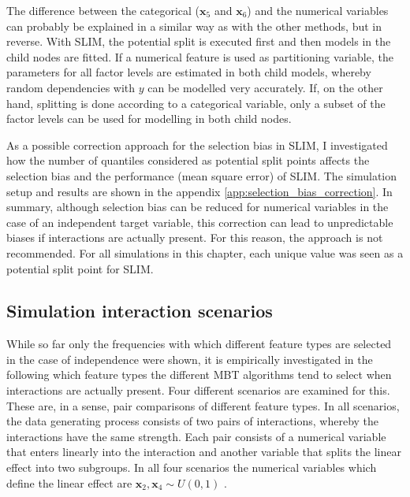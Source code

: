 The difference between the categorical ($\textbf{x}_5$ and $\textbf{x}_6$) and the numerical variables can probably be explained in a similar way as with the other methods, but in reverse. With SLIM, the potential split is executed first and then models in the child nodes are fitted.  If a numerical feature is used as partitioning variable, the parameters for all factor levels are estimated in both child models, whereby random dependencies with $y$ can be modelled very accurately. If, on the other hand, splitting is done according to a categorical variable, only a subset of the factor levels can be used for modelling in both child nodes.






As a possible correction approach for the selection bias in SLIM, I investigated how the number of quantiles considered as potential split points affects the selection bias and the performance (mean square error) of SLIM. The simulation setup and results are shown in the appendix \ref{app:selection_bias_correction}. In summary, although selection bias can be reduced for numerical variables in the case of an independent target variable, this correction can lead to unpredictable biases if interactions are actually present. For this reason, the approach is not recommended. 
For all simulations in this chapter, each unique value was seen as a potential split point for SLIM.






\subsection{Simulation interaction scenarios} \label{selection_bias_interactions}
While so far only the frequencies with which different feature types are selected in the case of independence were shown, it is empirically investigated in the following which feature types the different MBT algorithms tend to select when interactions are actually present.
Four different scenarios are examined for this. These are, in a sense, pair comparisons of different feature types. In all scenarios, the data generating process consists of two pairs of interactions, whereby the interactions have the same strength. Each pair consists of a numerical variable that enters linearly into the interaction and another variable that splits the linear effect into two subgroups.
In all four scenarios the numerical variables which define the linear effect are 
 $\textbf{x}_{2}, \textbf{x}_{4} \sim U(0,1)$ .

